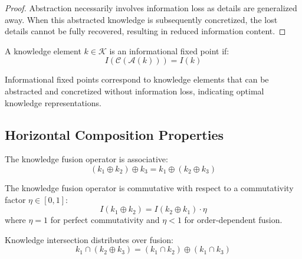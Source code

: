 \begin{proof}
Abstraction necessarily involves information loss as details are generalized away. When this abstracted knowledge is subsequently concretized, the lost details cannot be fully recovered, resulting in reduced information content.
\end{proof}

\begin{theorem}
A knowledge element $k \in \mathcal{K}$ is an informational fixed point if:
\begin{equation}
I(\mathcal{C}(\mathcal{A}(k))) = I(k)
\end{equation}
\end{theorem}

\begin{corollary}
Informational fixed points correspond to knowledge elements that can be abstracted and concretized without information loss, indicating optimal knowledge representations.
\end{corollary}

\subsection{Horizontal Composition Properties}

\begin{theorem}
The knowledge fusion operator is associative:
\begin{equation}
(k_1 \oplus k_2) \oplus k_3 = k_1 \oplus (k_2 \oplus k_3)
\end{equation}
\end{theorem}

\begin{theorem}
The knowledge fusion operator is commutative with respect to a commutativity factor $\eta \in [0, 1]$:
\begin{equation}
I(k_1 \oplus k_2) = I(k_2 \oplus k_1) \cdot \eta
\end{equation}
where $\eta = 1$ for perfect commutativity and $\eta < 1$ for order-dependent fusion.
\end{theorem}

\begin{theorem}
Knowledge intersection distributes over fusion:
\begin{equation}
k_1 \cap (k_2 \oplus k_3) = (k_1 \cap k_2) \oplus (k_1 \cap k_3)
\end{equation}
\end{theorem}

